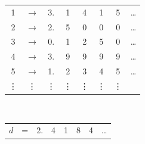 \documentclass{standalone}
\begin{document}
\setlength\tabcolsep{1pt} %
\begin{tabular}{cccccccc}
1 & \textbf{$\rightarrow$} & 3.\cellcolor{green} & 1 & 4 & 1 & 5 & \dots\\
2 & \textbf{$\rightarrow$} & 2. & 5 \cellcolor{green}& 0 & 0 & 0 & \dots\\
3 & \textbf{$\rightarrow$} & 0. & 1 & 2\cellcolor{green} & 5 & 0 & \dots\\
4 & \textbf{$\rightarrow$} & 3. & 9 & 9 & 9\cellcolor{green} & 9 & \dots\\
5 & \textbf{$\rightarrow$} & 1. & 2 & 3 & 4 & 5\cellcolor{green} & \dots\\
\vdots & \vdots & \vdots & \vdots & \vdots & \vdots & \vdots & \\
\end{tabular}
\\
\vspace{10pt}
\begin{tabular}{cccccccc}
$d$ & = & 2. & 4 & 1 & 8 & 4 & \dots\\
\end{tabular}

\end{document}

